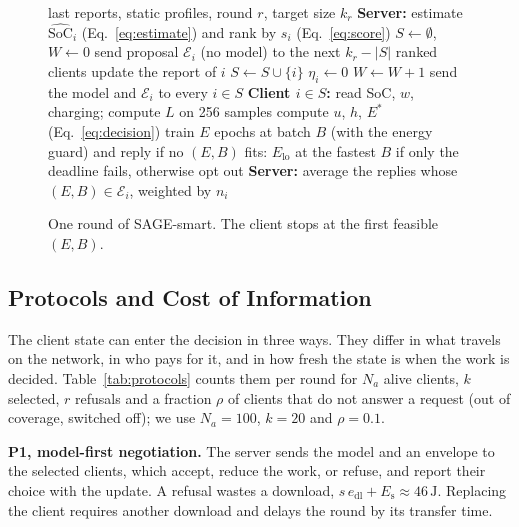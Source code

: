 \begin{figure}[t]
\small
\begin{algorithmic}[1]
\REQUIRE last reports, static profiles, round $r$, target size $k_r$
\STATE \textbf{Server:} estimate $\widehat{\mathrm{SoC}}_i$ (Eq.~\ref{eq:estimate}) and rank by $s_i$ (Eq.~\ref{eq:score})
\STATE $S \gets \emptyset$, $W \gets 0$
  \STATE send proposal $\mathcal{E}_i$ (no model) to the next $k_r-|S|$ ranked clients
    \STATE update the report of $i$
     \STATE $S \gets S\cup\{i\}$ \ELSE \STATE $\eta_i \gets 0$ \ENDIF
  \ENDFOR
  \STATE $W \gets W+1$
\ENDWHILE
\STATE send the model and $\mathcal{E}_i$ to every $i\in S$
\STATE \textbf{Client $i\in S$:} read SoC, $w$, charging; compute $L$ on 256 samples
\STATE compute $u$, $h$, $E^\ast$ (Eq.~\ref{eq:decision})
      \STATE train $E$ epochs at batch $B$ (with the energy guard) and reply
    \ENDIF
  \ENDFOR
\ENDFOR
\STATE if no $(E,B)$ fits: $E_{\mathrm{lo}}$ at the fastest $B$ if only the deadline fails, otherwise opt out
\STATE \textbf{Server:} average the replies whose $(E,B)\in\mathcal{E}_i$, weighted by $n_i$
\end{algorithmic}
\caption{One round of SAGE-smart. The client stops at the first feasible
$(E,B)$.}
\label{alg:smart}
\end{figure}

\subsection{Protocols and Cost of Information}\label{sec:protocols}

The client state can enter the decision in three ways. They differ in what
travels on the network, in who pays for it, and in how fresh the state is when
the work is decided. Table~\ref{tab:protocols} counts them per round for $N_a$
alive clients, $k$ selected, $r$ refusals and a fraction $\rho$ of clients that
do not answer a request (out of coverage, switched off); we use $N_a=100$,
$k=20$ and $\rho=0.1$.

\textbf{P1, model-first negotiation.} The server sends the model and an
envelope to the selected clients, which accept, reduce the work, or refuse, and
report their choice with the update. A refusal wastes a download,
$s\,e_{\mathrm{dl}}+E_{\mathrm{s}}\approx46\,\mathrm{J}$. Replacing the client
requires another download and delays the round by its transfer time.

